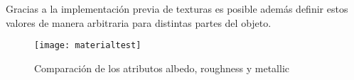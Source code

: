 Gracias a la implementación previa de texturas es posible además definir estos valores de manera arbitraria para distintas partes del objeto.

\begin{figure}[H]
	\centering
	\texttt{[image: materialtest]}
	\caption{Comparación de los atributos albedo, roughness y metallic}
	\label{fig:materialtest}
\end{figure}
	
